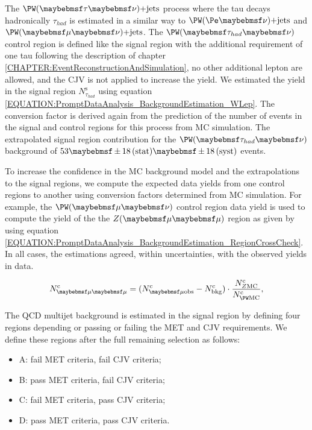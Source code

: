 The $\PW (\tau \nu)\text{+jets}$ process where the tau decays hadronically $\tau_{had}$ is estimated in a similar way to $\PW (\Pe \nu)\text{+jets}$ and $\PW (\mu \nu)\text{+jets}$. The $\PW (\tau_{had} \nu)$ control region is defined like the signal region with the additional requirement of one tau following the description of chapter \ref{CHAPTER:EventReconstructionAndSimulation}, no other additional lepton are allowed, and the \gls{CJV} is not applied to increase the yield. We estimated the yield in the signal region $N^\mathrm{s}_{\tau_{had}}$ using equation \ref{EQUATION:PromptDataAnalysis_BackgroundEstimation_WLep}. The conversion factor is derived again from the prediction of the number of events in the signal and control regions for this process from \gls{MC} simulation. The extrapolated signal region contribution for the $\PW (\tau_{had} \nu)$ background of $53 \pm 18\stat \pm 18\syst$ events.

To increase the confidence in the \gls{MC} background model and the extrapolations to the signal regions, we compute the expected data yields from one control regions to another using conversion factors determined from \gls{MC} simulation. For example, the $\PW (\mu \nu)$ control region data yield is used to compute the yield of the the $\Z (\mu \mu)$ region as given by using equation \ref{EQUATION:PromptDataAnalysis_BackgroundEstimation_RegionCrossCheck}. In all cases, the estimations agreed, within uncertainties, with the observed yields in data. 

\begin{equation}
N^\mathrm{c}_{\mu \mu} = (N^\mathrm{c}_{\mu \text{obs}} - N^\mathrm{c}_\text{bkg}) \cdot \frac{N^\mathrm{c}_{\Z \mathrm{MC}}}{N^\mathrm{c}_{\PW \mathrm{MC}}},
\label{EQUATION:PromptDataAnalysis_BackgroundEstimation_RegionCrossCheck}
\end{equation}

The \gls{QCD} multijet background is estimated in the signal region by defining four regions depending or passing or failing the \gls{MET} and \gls{CJV} requirements. We define these regions after the full remaining selection as follows:

\begin{itemize}
  \item{A: fail \gls{MET} criteria, fail \gls{CJV} criteria;}
  \item{B: pass \gls{MET} criteria, fail \gls{CJV} criteria;}
  \item{C: fail \gls{MET} criteria, pass \gls{CJV} criteria;}
  \item{D: pass \gls{MET} criteria, pass \gls{CJV} criteria.}
\end{itemize}

